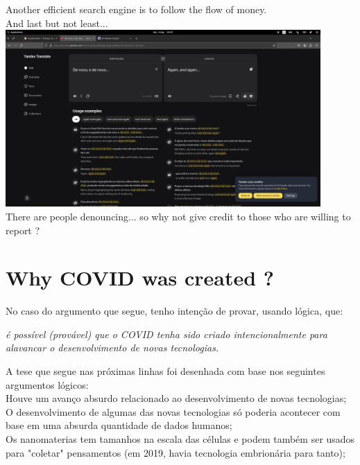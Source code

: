 \documentclass[11pt]{book}
\begin{document}
\noindent Another efficient search engine is to follow the flow of money. \\

\noindent And last but not least... \\

\includegraphics[width=0.9\textwidth]{figures/Screenshot from 2024-08-04 02.07.22.png} \\

\noindent There are people denouncing... so why not give credit to those who are willing to report ? \\

\chapter{Why COVID was created ?}

No caso do argumento que segue, tenho intenção de provar, usando lógica, que: \\

\noindent \begin{center} \emph{é possível (provável) que o COVID tenha sido criado intencionalmente para alavancar o desenvolvimento de novas tecnologias.} \end{center}

A tese que segue nas próximas linhas foi desenhada com base nos seguintes argumentos lógicos: \\

Houve um avanço absurdo relacionado ao desenvolvimento de novas tecnologias; \\

O desenvolvimento de algumas das novas tecnologias só poderia acontecer com base em uma absurda quantidade de dados humanos; \\

Os nanomaterias tem tamanhos na escala das células e podem também ser usados para "coletar" pensamentos (em 2019, havia tecnologia embrionária para tanto); \\
\end{document}
